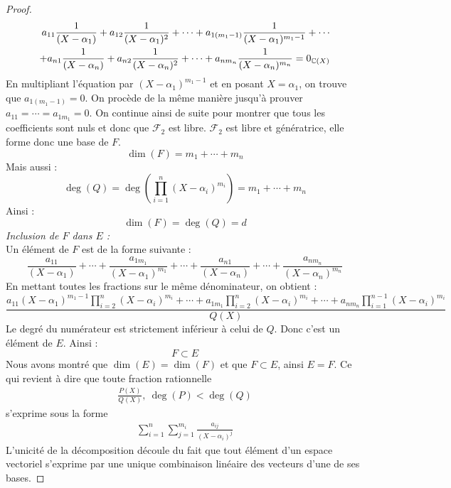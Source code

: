 \begin{proof}
\begin{align*}
        \begin{split}
            a_{11} \frac{1}{(X - \alpha_1)} + a_{12} \frac{1}{(X - \alpha_1)^2} + \cdots + a_{1(m_1 - 1)} \frac{1}{(X - \alpha_1)^{m_1 - 1}} + \cdots \\
            + a_{n1} \frac{1}{(X - \alpha_n)} + a_{n2} \frac{1}{(X - \alpha_n)^2} + \cdots + a_{nm_n} \frac{1}{(X - \alpha_n)^{m_n}} = 0_{\mathbb{C}(X)}
        \end{split}
    \end{align*}
    En multipliant l'équation par $(X - \alpha_1)^{m_1 - 1}$ et en posant $X = \alpha_1$, on trouve que $a_{1(m_1 - 1)} = 0$. On procède de la même manière jusqu'à prouver $a_{11} = \cdots = a_{1m_1} = 0$.
    On continue ainsi de suite pour montrer que tous les coefficients sont nuls et donc que $\mathcal{F}_2$ est libre. $\mathcal{F}_2$ est libre et génératrice, elle forme donc une base de $F$.
    \[ \dim(F) = m_1 + \cdots + m_n \]
    Mais aussi : 
    \[ \deg(Q) = \deg \left( \prod_{i=1}^{n} (X - \alpha_i)^{m_i} \right) = m_1 + \cdots + m_n \]
    Ainsi : \[ \dim(F) = \deg(Q) = d \]
    \emph{Inclusion de $F$ dans $E$ :}
    \\
    Un élément de $F$ est de la forme suivante : 
    \[ \frac{a_{11}}{(X - \alpha_1)} + \cdots + \frac{a_{1m_1}}{(X - \alpha_1)^{m_1}} + \cdots + \frac{a_{n1}}{(X - \alpha_n)} + \cdots + \frac{a_{nm_n}}{(X - \alpha_n)^{m_n}} \]
    En mettant toutes les fractions sur le même dénominateur, on obtient :
    \[ \frac{a_{11}(X - \alpha_1)^{m_1 - 1} \prod_{i = 2}^{n}(X - \alpha_i)^{m_i} + \cdots + a_{1m_1} \prod_{i = 2}^{n}(X - \alpha_i)^{m_i} + \cdots + a_{nm_n} \prod_{i = 1}^{n - 1}(X - \alpha_i)^{m_i}}{Q(X)} \]
    Le degré du numérateur est strictement inférieur à celui de $Q$. Donc c'est un élément de $E$. Ainsi :
    \[ F \subset E \]
    Nous avons montré que $\dim(E) = \dim(F)$ et que $F \subset E$, ainsi $E = F$.
    Ce qui revient à dire que toute fraction rationnelle 
    \begin{align*}
        \frac{P(X)}{Q(X)},\ \deg(P) < \deg(Q)
    \end{align*}
    s'exprime sous la forme 
    \begin{align*}
        \sum_{i=1}^n \sum_{j = 1}^{m_i} \frac{a_{ij}}{(X - \alpha_i)^j}
    \end{align*}
    L'unicité de la décomposition découle du fait que tout élément d'un espace vectoriel s'exprime par une unique combinaison linéaire des vecteurs d'une de ses bases.
\end{proof}